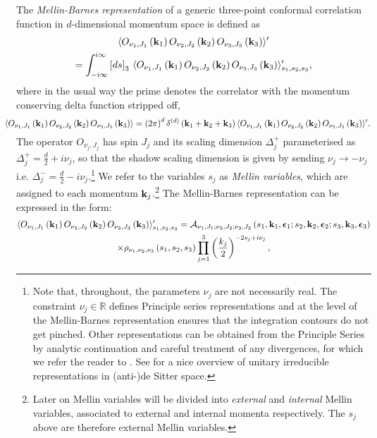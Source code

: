 \documentclass[11pt,a4paper]{article}
\begin{document}
The \emph{Mellin-Barnes representation} of a generic three-point conformal correlation function in $d$-dimensional momentum space is defined as 
\begin{multline}\label{3ptcormom}
    \langle O_{\nu_1,J_1}\left({\bf k}_1\right)O_{\nu_2,J_2}\left({\bf k}_2\right)O_{\nu_3,J_3}\left({\bf k}_3\right)  \rangle^\prime \\ = \int^{i\infty}_{-i\infty} \left[ds\right]_3\, \langle O_{\nu_1,J_1}\left({\bf k}_1\right)O_{\nu_2,J_2}\left({\bf k}_2\right)O_{\nu_3,J_3}\left({\bf k}_3\right)  \rangle^\prime_{s_1,s_2,s_3},
\end{multline}
where in the usual way the prime denotes the correlator with the momentum conserving delta function stripped off,
\begin{equation}\nonumber
  \hspace*{-0.5cm}  \langle O_{\nu_1,J_1}\left({\bf k}_1\right)O_{\nu_2,J_2}\left({\bf k}_2\right)O_{\nu_3,J_3}\left({\bf k}_3\right)  \rangle = \left(2\pi\right)^d \delta^{\left(d\right)}\left({\bf k}_1+{\bf k}_2+{\bf k}_3\right)  \langle O_{\nu_1,J_1}\left({\bf k}_1\right)O_{\nu_2,J_2}\left({\bf k}_2\right)O_{\nu_3,J_3}\left({\bf k}_3\right)  \rangle^\prime.
\end{equation}
The operator $O_{\nu_j,J_j}$ has spin $J_j$ and its scaling dimension $\Delta^+_j$ parameterised as $\Delta^+_j=\frac{d}{2}+i\nu_j$, so that the shadow scaling dimension is given by sending $\nu_j \to -\nu_j$ i.e. $\Delta^-_j=\frac{d}{2}-i\nu_j$.\footnote{Note that, throughout, the parameters $\nu_j$ are not necessarily real. The constraint $\nu_j \in \mathbb{R}$ defines Principle series representations and at the level of the Mellin-Barnes representation ensures that the integration contours do not get pinched. Other representations can be obtained from the Principle Series by analytic continuation and careful treatment of any divergences, for which we refer the reader to \cite{Sleight:2019hfp}. See \cite{Basile:2016aen} for a nice overview of unitary irreducible representations in (anti-)de Sitter space.} We refer to the variables $s_j$ as \emph{Mellin variables}, which are assigned to each momentum ${\bf k}_j$.\footnote{Later on Mellin variables will be divided into \emph{external} and \emph{internal} Mellin variables, associated to external and internal momenta respectively. The $s_j$ above are therefore external Mellin variables.} The Mellin-Barnes representation can be expressed in the form: 
\begin{multline}\label{MBrep3pt}
  \langle O_{\nu_1,J_1}\left({\bf k}_1\right)O_{\nu_2,J_2}\left({\bf k}_2\right)O_{\nu_3,J_3}\left({\bf k}_3\right)  \rangle^\prime_{s_1,s_2,s_3}  = {\cal A}_{\nu_1,J_1;\nu_2,J_2;\nu_3,J_3}\left(s_1,{\bf k}_1,\boldsymbol{\epsilon}_1;s_2,{\bf k}_2,\boldsymbol{\epsilon}_2;s_3,{\bf k}_3,\boldsymbol{\epsilon}_3\right)  \\  \times \rho_{\nu_1,\nu_2,\nu_3}\left(s_1,s_2,s_3\right)\prod^3_{j=1}\left(\frac{k_j}{2}\right)^{-2s_j+i\nu_j},
\end{multline}
\end{document}
